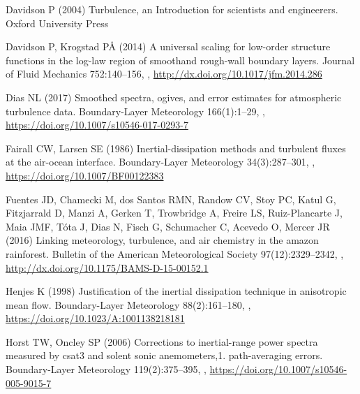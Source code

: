 \documentclass{svjour3}                     %
\begin{document}
\begin{thebibliography}{26}
Davidson P (2004) Turbulence, an Introduction for scientists and engineerers.
  Oxford University Press

Davidson P, Krogstad P{\r A} (2014) A universal scaling for low-order structure
  functions in the log-law region of smoothand rough-wall boundary layers.
  Journal of Fluid Mechanics 752:140--156, ,
  \urlprefix\url{http://dx.doi.org/10.1017/jfm.2014.286}

Dias NL (2017) Smoothed spectra, ogives, and error estimates for atmospheric
  turbulence data. Boundary-Layer Meteorology 166(1):1--29,
  ,
  \urlprefix\url{https://doi.org/10.1007/s10546-017-0293-7}

Fairall CW, Larsen SE (1986) Inertial-dissipation methods and turbulent fluxes
  at the air-ocean interface. Boundary-Layer Meteorology 34(3):287--301,
  , \urlprefix\url{https://doi.org/10.1007/BF00122383}

Fuentes JD, Chamecki M, dos Santos RMN, Randow CV, Stoy PC, Katul G,
  Fitzjarrald D, Manzi A, Gerken T, Trowbridge A, Freire LS, Ruiz-Plancarte J,
  Maia JMF, T\'{o}ta J, Dias N, Fisch G, Schumacher C, Acevedo O, Mercer JR
  (2016) Linking meteorology, turbulence, and air chemistry in the amazon
  rainforest. Bulletin of the American Meteorological Society
  97(12):2329--2342, ,
  \urlprefix\url{http://dx.doi.org/10.1175/BAMS-D-15-00152.1}

Henjes K (1998) Justification of the inertial dissipation technique in
  anisotropic mean flow. Boundary-Layer Meteorology 88(2):161--180,
  ,
  \urlprefix\url{https://doi.org/10.1023/A:1001138218181}

Horst TW, Oncley SP (2006) Corrections to inertial-range power spectra measured
  by csat3 and solent sonic anemometers,1. path-averaging errors.
  Boundary-Layer Meteorology 119(2):375--395, ,
  \urlprefix\url{https://doi.org/10.1007/s10546-005-9015-7}


\end{thebibliography}
\end{document}
